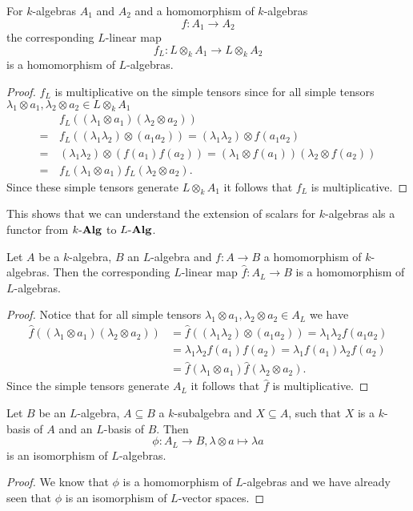 \begin{lem}
 For $k$-algebras $A_1$ and $A_2$ and a homomorphism of $k$-algebras
 \[
  f \colon A_1 \to A_2
 \]
 the corresponding $L$-linear map
 \[
  f_L \colon L \otimes_k A_1 \to L \otimes_k A_2
 \]
 is a homomorphism of $L$-algebras.
\end{lem}
\begin{proof}
 $f_L$ is multiplicative on the simple tensors since for all simple tensors $\lambda_1 \otimes a_1, \lambda_2 \otimes a_2 \in L \otimes_k A_1$
 \begin{align*}
   &\, f_L((\lambda_1 \otimes a_1)(\lambda_2 \otimes a_2)) \\
  =&\, f_L((\lambda_1 \lambda_2) \otimes (a_1 a_2))
  =    (\lambda_1 \lambda_2) \otimes f(a_1 a_2) \\
  =&\, (\lambda_1 \lambda_2) \otimes (f(a_1)f(a_2))
  =    (\lambda_1 \otimes f(a_1)) (\lambda_2 \otimes f(a_2)) \\
  =&\, f_L(\lambda_1 \otimes a_1) f_L(\lambda_2 \otimes a_2).
 \end{align*}
 Since these simple tensors generate $L \otimes_k A_1$ it follows that $f_L$ is multiplicative.
\end{proof}
 
 
This shows that we can understand the extension of scalars for $k$-algebras als a functor from $k\text{-}\mathbf{Alg}$ to $L\text{-}\mathbf{Alg}$.


\begin{lem}
 Let $A$ be a $k$-algebra, $B$ an $L$-algebra and $f \colon A \to B$ a homomorphism of $k$-algebras. Then the corresponding $L$-linear map $\hat{f} \colon A_L \to B$ is a homomorphism of $L$-algebras.
 \begin{proof}
 Notice that for all simple tensors $\lambda_1 \otimes a_1, \lambda_2 \otimes a_2 \in A_L$ we have
  \begin{align*}
   \hat{f}((\lambda_1 \otimes a_1)(\lambda_2 \otimes a_2))
   &= \hat{f}((\lambda_1 \lambda_2) \otimes (a_1 a_2))
   = \lambda_1 \lambda_2 f(a_1 a_2) \\
   &= \lambda_1 \lambda_2 f(a_1) f(a_2)
   = \lambda_1 f(a_1) \lambda_2 f(a_2) \\
   &= \hat{f}(\lambda_1 \otimes a_1) \hat{f}(\lambda_2 \otimes a_2).
  \end{align*}
  Since the simple tensors generate $A_L$ it follows that $\hat{f}$ is multiplicative.
 \end{proof}
\end{lem}


\begin{cor}\label{cor: inclusion to bijection algebras}
 Let $B$ be an $L$-algebra, $A \subseteq B$ a $k$-subalgebra and $X \subseteq A$, such that $X$ is a $k$-basis of $A$ and an $L$-basis of $B$. Then
 \[
  \phi \colon A_L \to B, \lambda \otimes a \mapsto \lambda a
 \]
 is an isomorphism of $L$-algebras.
\end{cor}
\begin{proof}
 We know that $\phi$ is a homomorphism of $L$-algebras and we have already seen that $\phi$ is an isomorphism of $L$-vector spaces.
\end{proof}


